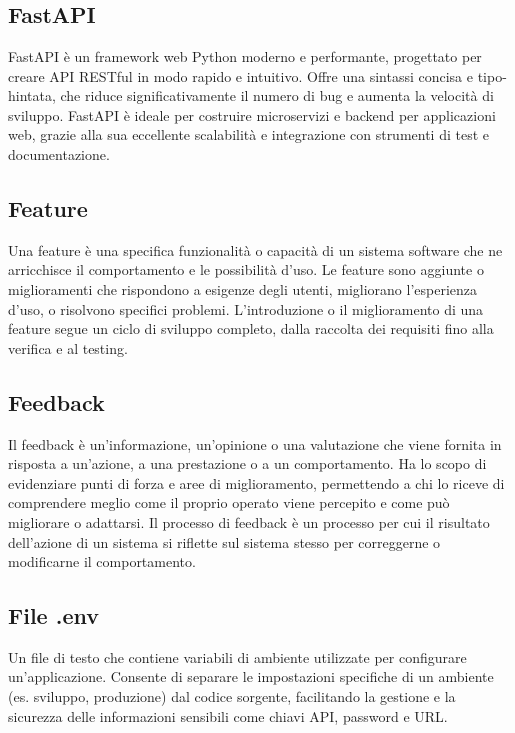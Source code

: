 
\section{}

\hypertarget{sec:fastapi}{}
\subsection*{FastAPI}
FastAPI è un framework web Python moderno e performante, progettato per creare API RESTful in modo rapido e intuitivo. Offre una sintassi 
concisa e tipo-hintata, che riduce significativamente il numero di bug e aumenta la velocità di sviluppo. FastAPI è ideale per 
costruire microservizi e backend per applicazioni web, grazie alla sua eccellente scalabilità e integrazione con strumenti di 
test e documentazione.

\hypertarget{sec:feature}{}
\subsection*{Feature}
Una feature è una specifica funzionalità o capacità di un sistema software che ne arricchisce il comportamento e le possibilità d'uso. Le feature sono 
aggiunte o miglioramenti che rispondono a esigenze degli utenti, migliorano l’esperienza d’uso, o risolvono specifici problemi. L'introduzione o il 
miglioramento di una feature segue un ciclo di sviluppo completo, dalla raccolta dei requisiti fino alla verifica e al testing.

\hypertarget{sec:feedback}{}
\subsection*{Feedback}
Il feedback è un'informazione, un'opinione o una valutazione che viene fornita in risposta a un'azione, a una prestazione o a un 
comportamento. Ha lo scopo di evidenziare punti di forza e aree di miglioramento, permettendo a chi lo riceve di comprendere meglio come il 
proprio operato viene percepito e come può migliorare o adattarsi. Il processo di feedback è un processo per cui il risultato dell’azione 
di un sistema si riflette sul sistema stesso per correggerne o modificarne il comportamento.

\hypertarget{sec:file-.env}{}
\subsection*{File .env}
Un file di testo che contiene variabili di ambiente utilizzate per configurare un'applicazione. Consente di separare le impostazioni 
specifiche di un ambiente (es. sviluppo, produzione) dal codice sorgente, facilitando la gestione e la sicurezza delle informazioni 
sensibili come chiavi API, password e URL.

